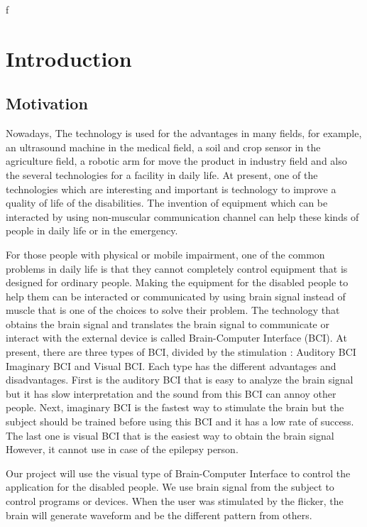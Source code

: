 f\chapter{Introduction}

\setlength{\parindent}{4em}
\setlength{\parskip}{1em}
\renewcommand{\baselinestretch}{1.5}
\section{Motivation}

\hspace{1.5cm}Nowadays, The technology is used for the advantages in many fields, for example, an ultrasound machine in the medical field, a soil and crop sensor in the agriculture field, a robotic arm for move the product in industry field and also the several technologies for a facility in daily life. At present, one of the technologies which are interesting and important is technology to improve a quality of life of the disabilities. The invention of equipment which can be interacted by using non-muscular communication channel can help these kinds of people in daily life or in the emergency.\par
For those people with physical or mobile impairment, one of the common problems in daily life is that they cannot completely control equipment that is designed for ordinary people. Making the equipment for the disabled people to help them can be interacted or communicated by using brain signal instead of muscle that is one of the choices to solve their problem. The technology that obtains the brain signal and translates the brain signal to communicate or interact with the external device is called Brain-Computer Interface (BCI). At present, there are three types of BCI, divided by the stimulation : Auditory BCI Imaginary BCI and Visual BCI. Each type has the different advantages and disadvantages. First is the auditory BCI that is easy to analyze the brain signal but it has slow interpretation and the sound from this BCI can annoy other people. Next, imaginary BCI is the fastest way to stimulate the brain but the subject should be trained before using this BCI and it has a low rate of success. The last one is visual BCI that is the easiest way to obtain the brain signal However, it cannot use in case of the epilepsy person.\par
Our project will use the visual type of Brain-Computer Interface to control the application for the disabled people. We use brain signal from the subject to control programs or devices. When the user was stimulated by the flicker, the brain will generate waveform and be the different pattern from others.  

